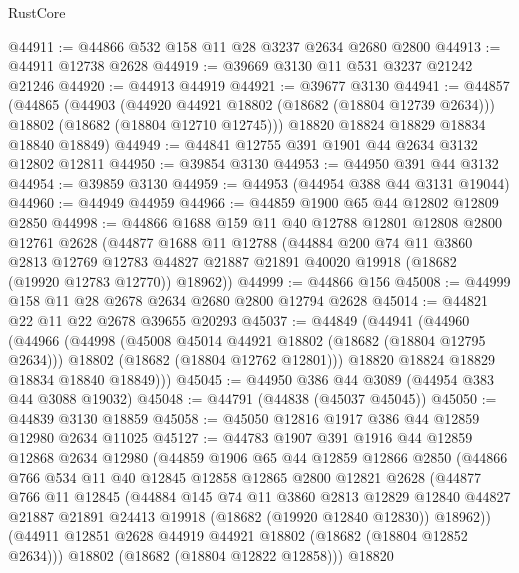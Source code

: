 \begin{lexlean}{RustCore}
\begin{coremodule}
@44911 := @44866 @532 @158 @11 @28 @3237 @2634 @2680 @2800
@44913 := @44911 @12738 @2628
@44919 := @39669 @3130 @11 @531 @3237 @21242 @21246
@44920 := @44913 @44919
@44921 := @39677 @3130
@44941 := @44857
    (@44865
      (@44903
        (@44920 @44921 @18802 (@18682 (@18804 @12739 @2634)))
        @18802
        (@18682 (@18804 @12710 @12745)))
      @18820
      @18824
      @18829
      @18834
      @18840
      @18849)
@44949 := @44841 @12755 @391 @1901 @44 @2634 @3132 @12802 @12811
@44950 := @39854 @3130
@44953 := @44950 @391 @44 @3132
@44954 := @39859 @3130
@44959 := @44953 (@44954 @388 @44 @3131 @19044)
@44960 := @44949 @44959
@44966 := @44859 @1900 @65 @44 @12802 @12809 @2850
@44998 := @44866
    @1688
    @159
    @11
    @40
    @12788
    @12801
    @12808
    @2800
    @12761
    @2628
    (@44877
      @1688
      @11
      @12788
      (@44884
        @200
        @74
        @11
        @3860
        @2813
        @12769
        @12783
        @44827
        @21887
        @21891
        @40020
        @19918
        (@18682 (@19920 @12783 @12770))
        @18962))
@44999 := @44866 @156
@45008 := @44999 @158 @11 @28 @2678 @2634 @2680 @2800 @12794 @2628
@45014 := @44821 @22 @11 @22 @2678 @39655 @20293
@45037 := @44849
    (@44941
      (@44960
        (@44966
          (@44998
            (@45008 @45014 @44921 @18802 (@18682 (@18804 @12795 @2634)))
            @18802
            (@18682 (@18804 @12762 @12801)))
          @18820
          @18824
          @18829
          @18834
          @18840
          @18849)))
@45045 := @44950 @386 @44 @3089 (@44954 @383 @44 @3088 @19032)
@45048 := @44791 (@44838 (@45037 @45045))
@45050 := @44839 @3130 @18859
@45058 := @45050 @12816 @1917 @386 @44 @12859 @12980 @2634 @11025
@45127 := @44783
    @1907
    @391
    @1916
    @44
    @12859
    @12868
    @2634
    @12980
    (@44859
      @1906
      @65
      @44
      @12859
      @12866
      @2850
      (@44866
        @766
        @534
        @11
        @40
        @12845
        @12858
        @12865
        @2800
        @12821
        @2628
        (@44877
          @766
          @11
          @12845
          (@44884
            @145
            @74
            @11
            @3860
            @2813
            @12829
            @12840
            @44827
            @21887
            @21891
            @24413
            @19918
            (@18682 (@19920 @12840 @12830))
            @18962))
        (@44911 @12851 @2628 @44919 @44921 @18802 (@18682 (@18804 @12852 @2634)))
        @18802
        (@18682 (@18804 @12822 @12858)))
      @18820

\end{coremodule}
\end{lexlean}
